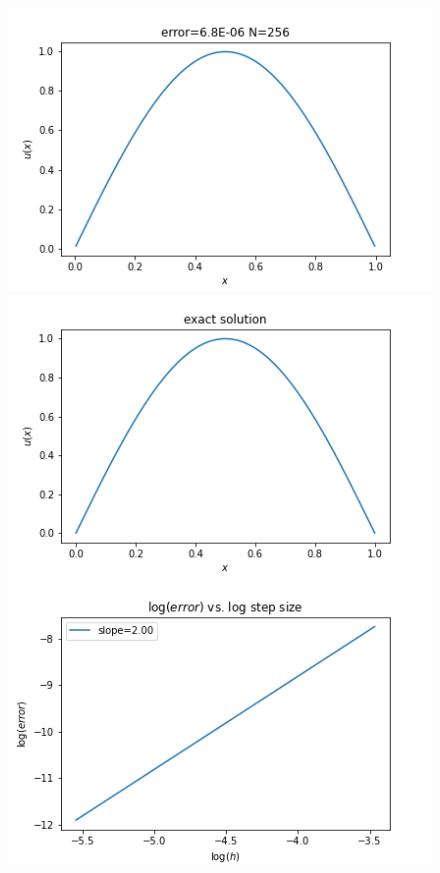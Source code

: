 \documentclass[10pt]{article}
\begin{document}
\begin{enumerate}[label=(\alph*)]
\begin{figure}[H]
        \includegraphics[scale=0.33]{hw_6_q_5_N_256.png}
        \includegraphics[scale=0.33]{exact_solution_hw_6_q_5.png}
        \includegraphics[scale=0.33]{q_5_error_vs_step_size.png}
    \end{figure}
\end{enumerate}

\end{document}
